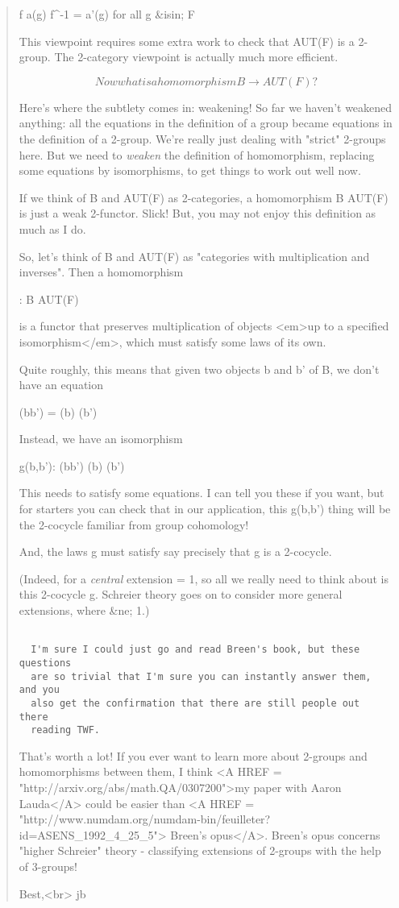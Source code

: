\begin{quote}
f a(g) f^{-1} = a'(g)   for all g &isin; F

This viewpoint requires some extra work to check that AUT(F) is a 
2-group.  The 2-category viewpoint is actually much more efficient.


$$

  Now what is a homomorphism B \to  AUT(F)?
$$
    

Here's where the subtlety comes in: weakening!  So far we haven't
weakened anything: all the equations in the definition of a group
became equations in the definition of a 2-group.  We're really just
dealing with "strict" 2-groups here.  
But we need to \emph{weaken} the
definition of homomorphism, replacing some equations by isomorphisms,
to get things to work out well now.

If we think of B and AUT(F) as 2-categories, a homomorphism B \to  AUT(F)
is just a weak 2-functor.  Slick!  But, you may not enjoy this definition 
as much as I do.

So, let's think of B and AUT(F) as "categories with multiplication and
inverses".  Then a homomorphism 

\alpha : B \to  AUT(F) 

is a functor that preserves multiplication of objects <em>up to a 
specified isomorphism</em>, which must satisfy some laws of its own.  

Quite roughly, this means that given two objects b and b' of B,
we don't have an equation

\alpha (bb') = \alpha (b) \alpha (b')

Instead, we have an isomorphism

g(b,b'): \alpha (bb') \to  \alpha (b) \alpha (b')   

This needs to satisfy some equations.  I can tell you these if you
want, but for starters you can check that in our application, this 
g(b,b') thing will be the 2-cocycle familiar from group cohomology!

And, the laws g must satisfy say precisely that g is a 2-cocycle.

(Indeed, for a \emph{central} extension \alpha  = 1, so all we really need
to think about is this 2-cocycle g.  Schreier theory goes on to consider 
more general extensions, where \alpha  &ne; 1.)


\begin{verbatim}

  I'm sure I could just go and read Breen's book, but these questions
  are so trivial that I'm sure you can instantly answer them, and you
  also get the confirmation that there are still people out there
  reading TWF.
\end{verbatim}
    

That's worth a lot!  If you ever want to learn more about 2-groups 
and homomorphisms between them, I think 
<A HREF = "http://arxiv.org/abs/math.QA/0307200">my 
paper with Aaron Lauda</A>
could be easier than 
<A HREF = "http://www.numdam.org/numdam-bin/feuilleter?id=ASENS_1992_4_25_5">
Breen's opus</A>.  Breen's opus concerns "higher
Schreier" theory - classifying extensions of 2-groups with the help
of 3-groups!

Best,<br>
jb
\end{quote}

